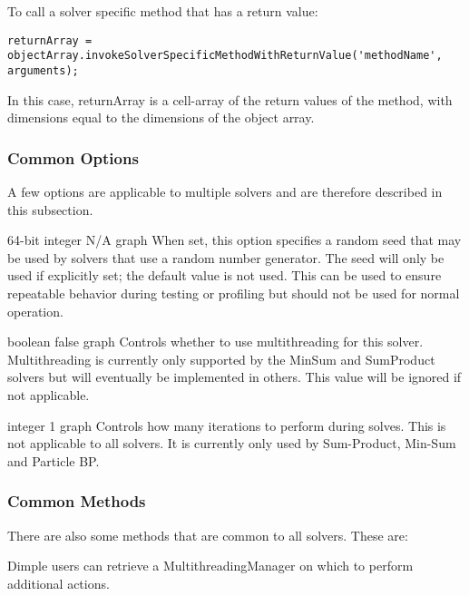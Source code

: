 To call a solver specific method that has a return value:
\begin{lstlisting}
returnArray = objectArray.invokeSolverSpecificMethodWithReturnValue('methodName', arguments);
\end{lstlisting}

In this case, returnArray is a cell-array of the return values of the method, with dimensions equal to the dimensions of the object array.

\fi

\subsubsection{Common Options}

A few options are applicable to multiple solvers and are therefore described in this subsection.


{64-bit integer}
{N/A}
{graph}
{When set, this option specifies a random seed that may be used by solvers that use a random number generator. The seed will only be used if explicitly set; the default value is not used. This can be used to ensure repeatable behavior during testing or profiling but should not be used for normal operation.}


{boolean}
{false}
{graph}
{Controls whether to use multithreading for this solver. Multithreading is currently only supported by the MinSum and SumProduct solvers but will eventually be implemented in others. This value will be ignored if not applicable.}


{integer}
{1}
{graph}
{Controls how many iterations to perform during solves. This is not applicable to all solvers. It is currently only used by Sum-Product, Min-Sum and Particle BP.}

\subsubsection{Common Methods}

There are also some methods that are common to all solvers. These are:


Dimple users can retrieve a MultithreadingManager on which to perform additional actions.


